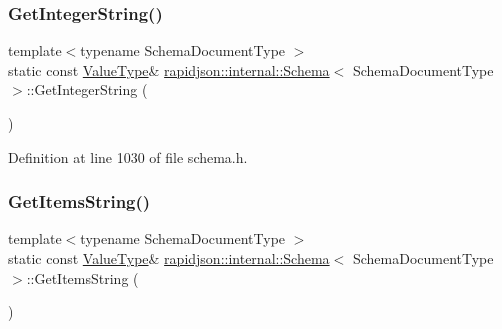 \subsubsection{\texorpdfstring{GetIntegerString()}{GetIntegerString()}}
{\footnotesize\ttfamily template$<$typename Schema\+Document\+Type $>$ \\
static const \mbox{\hyperlink{classrapidjson_1_1internal_1_1_schema_a3979a9083c598195927c08c6e3ba91d1}{Value\+Type}}\& \mbox{\hyperlink{classrapidjson_1_1internal_1_1_schema}{rapidjson\+::internal\+::\+Schema}}$<$ Schema\+Document\+Type $>$\+::Get\+Integer\+String (\begin{DoxyParamCaption}{ }\end{DoxyParamCaption})\hspace{0.3cm}{\ttfamily [static]}}



Definition at line 1030 of file schema.\+h.


\begin{DoxyCode}{0}

\end{DoxyCode}
\mbox{\label{classrapidjson_1_1internal_1_1_schema_a57b036c07c01bf7f1546f93467d9c32e}} 
\subsubsection{\texorpdfstring{GetItemsString()}{GetItemsString()}}
{\footnotesize\ttfamily template$<$typename Schema\+Document\+Type $>$ \\
static const \mbox{\hyperlink{classrapidjson_1_1internal_1_1_schema_a3979a9083c598195927c08c6e3ba91d1}{Value\+Type}}\& \mbox{\hyperlink{classrapidjson_1_1internal_1_1_schema}{rapidjson\+::internal\+::\+Schema}}$<$ Schema\+Document\+Type $>$\+::Get\+Items\+String (\begin{DoxyParamCaption}{ }\end{DoxyParamCaption})\hspace{0.3cm}{\ttfamily [static]}}




